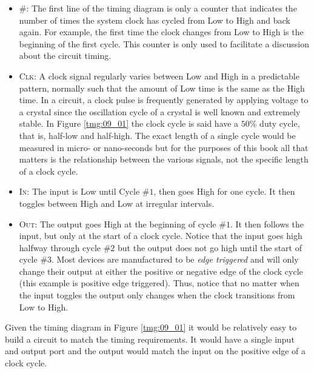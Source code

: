 \begin{itemize}

  \item \textsc{\#}: The first line of the timing diagram is only a counter that indicates the number of times the system clock has cycled from Low to High and back again. For example, the first time the clock changes from Low to High is the beginning of the first cycle. This counter is only used to facilitate a discussion about the circuit timing. 

  \item \textsc{Clk}: A clock signal regularly varies between Low and High in a predictable pattern, normally such that the amount of Low time is the same as the High time. In a circuit, a clock pulse is frequently generated by applying voltage to a crystal since the oscillation cycle of a crystal is well known and extremely stable. In Figure \ref{tmg:09_01} the clock cycle is said have a $ 50 $\% duty cycle, that is, half-low and half-high. The exact length of a single cycle would be measured in micro- or nano-seconds but for the purposes of this book all that matters is the relationship between the various signals, not the specific length of a clock cycle.
  
  \item \textsc{In}: The input is Low until Cycle \#$ 1 $, then goes High for one cycle. It then toggles between High and Low at irregular intervals.
  
  \item \textsc{Out}: The output goes High at the beginning of cycle \#$ 1 $. It then follows the input, but only at the start of a clock cycle. Notice that the input goes high halfway through cycle \#$ 2 $ but the output does not go high until the start of cycle \#$ 3 $. Most devices are manufactured to be \emph{edge triggered} and will only change their output at either the positive or negative edge of the clock cycle (this example is positive edge triggered). Thus, notice that no matter when the input toggles the output only changes when the clock transitions from Low to High.

\end{itemize}

Given the timing diagram in Figure \ref{tmg:09_01} it would be relatively easy to build a circuit to match the timing requirements. It would have a single input and output port and the output would match the input on the positive edge of a clock cycle.

